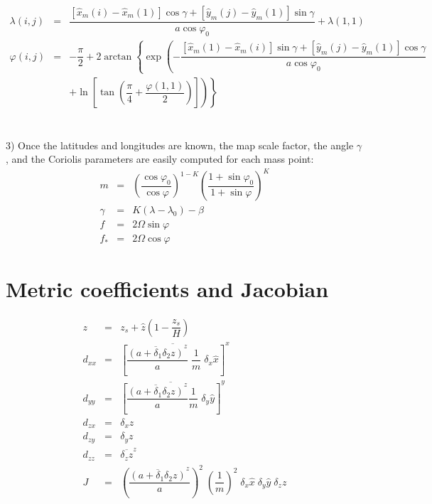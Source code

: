 \begin{eqnarray}
\lambda (i,j) &=&  \dfrac{\left[ \widehat{x}_{m}(i)-\widehat{x}_{m}(1) \right]
\cos \gamma + \left[\widehat{y}_{m}(j)-\widehat{y}_{m}(1) \right]\sin \gamma  }
{a \cos \varphi _{0}}
  + \lambda(1,1) \nonumber \\
\varphi (i,j) & = & -\dfrac{\pi}{2} + 2 \arctan \left\{ \exp \left( -
\dfrac{\left[\widehat{x}_{m}(1)-\widehat{x}_{m}(i) \right]
\sin \gamma + \left[\widehat{y}_{m}(j)-\widehat{y}_{m}(1) \right]\cos \gamma  }{a \cos \varphi _{0} } \right. \right.  \nonumber \\
& & \left. \left. +  \ln \left[ \tan (\dfrac{\pi}{4} +\dfrac{ \varphi(1,1)}{2})
\right]
\right)
\right\}
\end{eqnarray}
\\
\\
3) Once the latitudes and longitudes are known, the map scale factor,
the angle $\gamma$, and the Coriolis parameters are easily
computed for each mass point:
\begin{eqnarray}
m&=&\left( \dfrac{\cos \varphi _{0}}{\cos \varphi}\right)^{1-K}
\left( \dfrac{1 + \sin\varphi _{0}}{1 + \sin\varphi} \right)^{K} \\
\gamma & = & K (\lambda - \lambda _{0}) - \beta \nonumber \\
f&=&2\Omega \sin\varphi \\
f_{*}&=&2\Omega \cos\varphi
\end{eqnarray}


\section{Metric coefficients and Jacobian}

\begin{eqnarray}
z & = & z_{s} + \widehat{z} \left( 1 - \dfrac{z_{s}}{H} \right) \\
 d_{xx} &  = & \overline{ \left[ \dfrac{\overline{\left(a+ \delta _{1}\delta _{2} z\right)}^{z}}{a}
\;  \dfrac{1}{m}\;  \delta_{x}\widehat{x} \right]}^{x} \\
 d_{yy}  & = & \overline{ \left[\dfrac{ \overline{\left(a+ \delta _{1}\delta _{2} z \right)}^{z}}{a}
 \dfrac{1}{m}\; \delta_y \widehat{y} \right] }^{y} \\
 d_{zx} & = & \delta_{x} z \\  d_{zy} & = & \delta_{y} z \\
 d_{zz} & = & \overline{\delta_{z} z}^z  \\
  J   &  = & \left(
 \dfrac{ \overline{ \left( a+ \delta _{1}\delta _{2} z \right)}^{z}}{a} \right)^{2}
\;  \left( \dfrac{1}{m} \right)^{2} \;
\delta_x \widehat{x} \; \delta_y \widehat{y} \; \delta_z z
\end{eqnarray}

